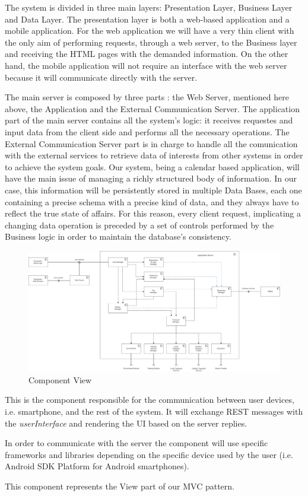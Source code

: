The system is divided in three main layers: Presentation Layer, Business Layer and Data Layer.
The presentation layer is both a web-based application and a mobile application. For the web application we will have a very thin client with the only aim of performing requests, through a web server, to the Business layer and receiving the HTML pages with the demanded information.
On the other hand, the mobile application will not require an interface with the web server because it will communicate directly with the server.

The main server is composed by three parts : the Web Server, mentioned here above, the Application and the External Communication Server. The application part of the main server contains all the system's logic: it receives requestes and input data from the client side and performs all the necessary operations.
The External Communication Server part is in charge to handle all the comunication with the external services to retrieve data of interests from other systems in order to achieve the system goals.
Our system, being a calendar based application, will have the main issue of managing a richly structured body of information. In our case, this information will be persistently stored in multiple Data Bases, each one containing a precise schema with a precise kind of data, and they always have to reflect the true state of affairs. For this reason, every client request, implicating a changing data operation is preceded by a set of controls performed by the Business logic in order to maintain the database’s consistency.

\begin{figure}[H]
	\centering
	\includegraphics[scale=0.17]{Images/Architecture/Components_View}
	\caption{Component View}
\end{figure}
This is the component responsible for the communication between user devices, i.e. smartphone, and the rest of the system. It will exchange REST messages with the \emph{userInterface} and rendering the UI based on the server replies.\par
In order to communicate with the server the component will use specific frameworks and libraries depending on the specific device used by the user (i.e. Android SDK Platform for Android smartphones).\par
This component represents the View part of our MVC pattern.


